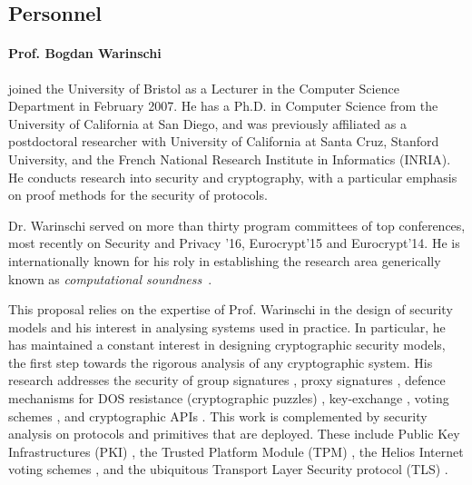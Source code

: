 
\subsection{Personnel}
\label{sec:prev_people}
\fi

\paragraph{Prof. Bogdan Warinschi} joined the University of 
Bristol as a Lecturer in the Computer Science Department in February 2007. 
He has a Ph.D. in Computer Science from the University of California
at San Diego, and was previously affiliated as a postdoctoral researcher with
University of California at Santa Cruz, Stanford University, and the
French National Research Institute in Informatics (INRIA).
He conducts research into security and cryptography, with a particular emphasis on
proof methods for the security of protocols.


Dr. Warinschi served on more than thirty program committees of top conferences, most recently on Security and Privacy '16, Eurocrypt'15 and Eurocrypt'14.  He is internationally known for his roly in establishing the research area generically known as {\em computational   soundness}~\cite{cortier05computationally,micciancio04soundness}.

This proposal relies on the expertise of Prof. Warinschi in the design of security models and his interest in analysing systems used in practice. In particular, he has maintained a constant interest in designing cryptographic security models, the first step towards the rigorous analysis of any cryptographic system. 
His research addresses the security of group signatures \cite{BMW03}, proxy signatures \cite{proxies}, defence mechanisms for DOS resistance (cryptographic puzzles) \cite{puzzles},  key-exchange \cite{ke}, voting schemes \cite{helios}, and cryptographic APIs \cite{KSW11}.
This work is complemented by security analysis on protocols and primitives that are deployed.   These include Public Key Infrastructures (PKI) \cite{boldyreva07acloser}, the Trusted Platform Module (TPM) \cite{pcas}, the Helios Internet voting schemes \cite{helios}, and the ubiquitous Transport Layer Security protocol (TLS) \cite{tls}. 

